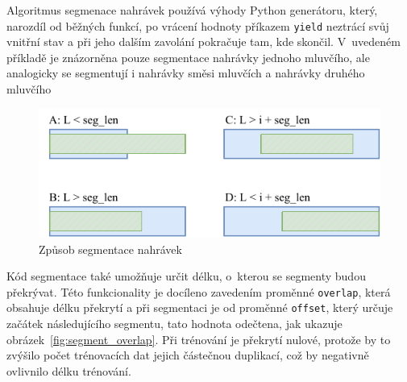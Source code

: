 \bigskip

\begin{algorithm}[H]
 \caption{\label{alg:segmentace_nahravek}Algoritmus segmenace nahrávek používá výhody Python generátoru, který, narozdíl od běžných funkcí, po vrácení hodnoty příkazem \texttt{yield} neztrácí svůj vnitřní stav a při jeho dalším zavolání pokračuje tam, kde skončil. V~uvedeném příkladě je znázorněna pouze segmentace nahrávky jednoho mluvčího, ale analogicky se segmentují i nahrávky směsi mluvčích a nahrávky druhého mluvčího}

\SetNoFillComment


\end{algorithm}


\begin{figure}[H]
    \centering
    \includegraphics[scale=1.0]{obrazky-figures/segmentation.pdf}
    \caption{\label{fig:generovani_segmentu}Způsob segmentace nahrávek}
\end{figure}


Kód segmentace také umožňuje určit délku, o~kterou se segmenty budou překrývat. Této funkcionality je docíleno zavedením proměnné \texttt{overlap}, která obsahuje délku překrytí a při segmentaci je od proměnné \texttt{offset}, který určuje začátek následujícího segmentu, tato hodnota odečtena, jak ukazuje obrázek~\ref{fig:segment_overlap}. Při trénování je překrytí nulové, protože by to zvýšilo počet trénovacích dat jejich částečnou duplikací, což by negativně ovlivnilo délku trénování.

